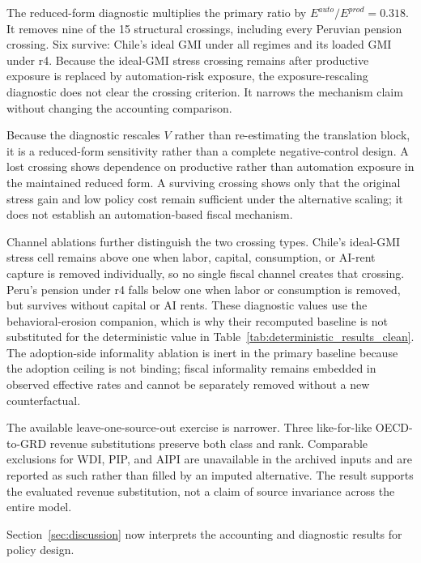 The reduced-form diagnostic multiplies the primary ratio by $E^{auto}/E^{prod}=0.318$. It removes nine of the 15 structural crossings, including every Peruvian pension crossing. Six survive: Chile's ideal GMI under all regimes and its loaded GMI under r4. Because the ideal-GMI stress crossing remains after productive exposure is replaced by automation-risk exposure, the exposure-rescaling diagnostic does not clear the crossing criterion. It narrows the mechanism claim without changing the accounting comparison.

Because the diagnostic rescales $V$ rather than re-estimating the translation block, it is a reduced-form sensitivity rather than a complete negative-control design. A lost crossing shows dependence on productive rather than automation exposure in the maintained reduced form. A surviving crossing shows only that the original stress gain and low policy cost remain sufficient under the alternative scaling; it does not establish an automation-based fiscal mechanism.

Channel ablations further distinguish the two crossing types. Chile's ideal-GMI stress cell remains above one when labor, capital, consumption, or AI-rent capture is removed individually, so no single fiscal channel creates that crossing. Peru's pension under r4 falls below one when labor or consumption is removed, but survives without capital or AI rents. These diagnostic values use the behavioral-erosion companion, which is why their recomputed baseline is not substituted for the deterministic value in Table~\ref{tab:deterministic_results_clean}. The adoption-side informality ablation is inert in the primary baseline because the adoption ceiling is not binding; fiscal informality remains embedded in observed effective rates and cannot be separately removed without a new counterfactual.

The available leave-one-source-out exercise is narrower. Three like-for-like OECD-to-GRD revenue substitutions preserve both class and rank. Comparable exclusions for WDI, PIP, and AIPI are unavailable in the archived inputs and are reported as such rather than filled by an imputed alternative. The result supports the evaluated revenue substitution, not a claim of source invariance across the entire model.



Section~\ref{sec:discussion} now interprets the accounting and diagnostic results for policy design.
